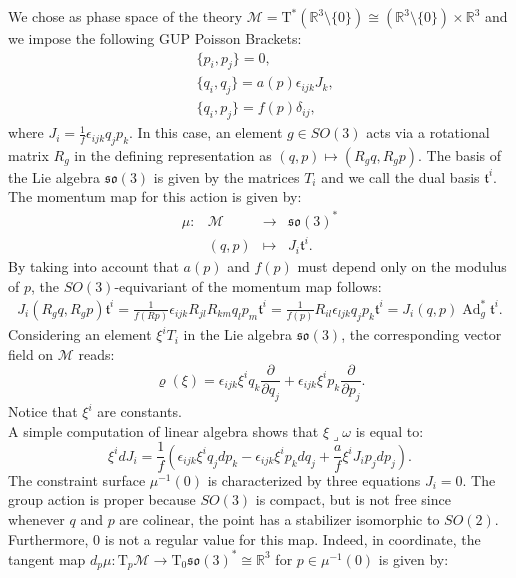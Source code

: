 \documentclass{article}
\numberwithin{equation}{section}
\theoremstyle{definition}
\newcommand{\R}{\mathbb{R}}
\newcommand{\so}[1]{\mathfrak{so}(#1)}
\newcommand{\M}{\mathcal{M}}
\newcommand{\T}{\mathrm{T}}
\newcommand{\Ad}{\operatorname{Ad}}
\newcommand{\inn}{\operatorname{\lrcorner}}
\newcommand{\pder}[2]{\frac{\partial #1}{\partial #2}}
\begin{document}
We chose as phase space of the theory $\M=\T^*(\R^3\setminus\{0\})\cong(\R^3\setminus\{0\})\times\R^3$ and we impose the following GUP Poisson Brackets:
\begin{equation}
\label{Maggiore-GUP}
    \begin{split}
    &\{p_i,p_j\}=0, \\
    &\{q_i,q_j\}= a(p)\epsilon_{ijk}J_{k}, \\  &\{q_i,p_j\}= f(p)\delta_{ij},
    \end{split}
\end{equation}
where $J_i=\tfrac{1}{f}\epsilon_{ijk}q_jp_k$.
In this case, an element $g\in SO(3)$ acts via a rotational matrix $R_g$ in the defining representation as $(q,p)\mapsto(R_gq,R_gp)$. The basis of the Lie algebra $\so{3}$ is given by the matrices $T_i$ and we call the dual basis $\mathfrak{t}^i$. The momentum map for this action is given by:
\begin{equation}
    \begin{matrix}
        \mu: & \M& \to &\so{3}^*\\
        & (q,p)& \mapsto & J_i\mathfrak{t}^i.
    \end{matrix}
\end{equation}
By taking into account that $a(p)$ and $f(p)$ must depend only on the modulus of $p$, the $SO(3)$-equivariant of the momentum map follows:
\begin{align*}
    J_i(R_gq,R_gp)\mathfrak{t}^i=\frac{1}{f(Rp)}\epsilon_{ijk}R_{jl}R_{km}q_lp_m\mathfrak{t}^i=\frac{1}{f(p)}R_{il}\epsilon_{ljk}q_jp_k\mathfrak{t}^i=J_i(q,p)\Ad^*_g\mathfrak{t}^i.
\end{align*}
Considering an element $\xi^iT_i$ in the Lie algebra $\so{3}$, the corresponding vector field on $\M$ reads:
\begin{equation}
    \varrho(\xi)=\epsilon_{ijk}\xi^iq_k\pder{}{q_j}+\epsilon_{ijk}\xi^ip_k\pder{}{p_j}.
\end{equation}
Notice that $\xi^i$ are constants. \\
A simple computation of linear algebra shows that $\xi\inn\omega$ is equal to:
\begin{equation}
    \xi^idJ_i=\frac{1}{f}\left(\epsilon_{ijk}\xi^iq_jdp_k-\epsilon_{ijk}\xi^ip_kdq_j+\frac{a}{f}\xi^iJ_ip_jdp_j\right).
\end{equation}
The constraint surface $\mu^{-1}(0)$ is characterized by three equations $J_i=0$. The group action is proper because $SO(3)$ is compact, but is not free since whenever $q$ and $p$ are colinear, the point has a stabilizer isomorphic to $SO(2)$.  Furthermore, $0$ is not a regular value for this map. Indeed, in coordinate, the tangent map $d_p\mu:\T_p\M\to \T_0\so{3}^*\cong\R^3$ for $p\in\mu^{-1}(0)$ is given by:
\end{document}
